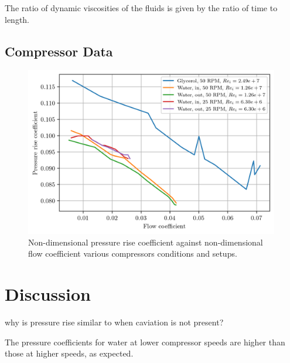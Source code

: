 \documentclass{article}
\begin{document}
The ratio of dynamic viscosities of the fluids is given by the ratio of time to length.

\subsection{Compressor Data}

\begin{figure}[H]
    \centering
    \includegraphics[width=0.99\textwidth]{compressor_non_dims.png}
    \caption{Non-dimensional pressure rise coefficient against non-dimensional flow coefficient various compressors conditions and setups.}
    \label{fig:compressor_non_dims}
\end{figure}

\section{Discussion}


why is pressure rise similar to when caviation is not present?


The pressure coefficients for water at lower compressor speeds are higher than those at higher speeds, as expected.


\end{document}
